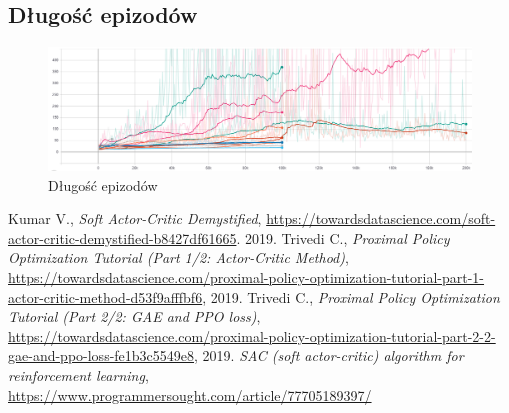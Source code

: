 \documentclass[a4paper,12pt]{article}
\begin{document}
\subsection{Długość epizodów}
\begin{figure}[H]
	\centering
	\includegraphics[width=\textwidth]{episode_length}
	\caption{Długość epizodów}
	\label{pic:length}
\end{figure}


\begin{thebibliography}{20}
	Kumar V., \textit{Soft Actor-Critic Demystified}, \url{https://towardsdatascience.com/soft-actor-critic-demystified-b8427df61665}. 2019.
	 Trivedi C., \textit{Proximal Policy Optimization Tutorial (Part 1/2: Actor-Critic Method)}, \url{https://towardsdatascience.com/proximal-policy-optimization-tutorial-part-1-actor-critic-method-d53f9afffbf6}, 2019.
	 Trivedi C., \textit{Proximal Policy Optimization Tutorial (Part 2/2: GAE and PPO loss)}, \url{https://towardsdatascience.com/proximal-policy-optimization-tutorial-part-2-2-gae-and-ppo-loss-fe1b3c5549e8}, 2019.
	 \textit{SAC (soft actor-critic) algorithm for reinforcement learning}, \url{https://www.programmersought.com/article/77705189397/}
\end{thebibliography}
\end{document}
